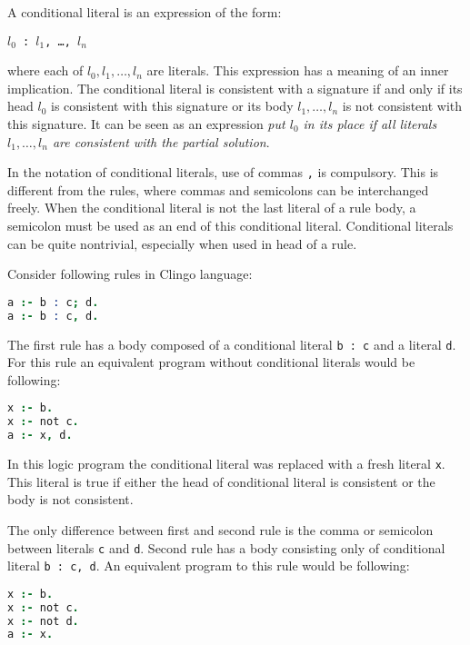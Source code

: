 A conditional literal is an expression of the form:
\begin{center}
    \texttt{$l_0$ : $l_1$, \ldots, $l_n$}  %
\end{center}
where each of $l_0, l_1, \ldots, l_n$ are literals. This expression has a meaning
of an inner implication. The conditional literal is consistent with a signature
if and only if its head $l_0$ is consistent with this signature
or its body $l_1, \ldots, l_n$ is not consistent with this signature.
It can be seen as an expression
\textit{put $l_0$ in its place if all literals $l_1, \ldots, l_n$
are consistent with the partial solution}.

In the notation of conditional literals, use of commas \texttt{,} is compulsory.
This is different from the rules, where commas and semicolons can be interchanged freely.
When the conditional literal is not the last literal of a rule body,
a semicolon must be used as an end of this conditional literal.
Conditional literals can be quite nontrivial, especially when used in head of a rule.

\begin{example}\label{exp:conditional_literal}
    Consider following rules in Clingo language:
    \begin{lstlisting}[language=prolog, numbers=none]
a :- b : c; d.
a :- b : c, d.
\end{lstlisting}

    The first rule has a body composed of a conditional literal
    \texttt{b : c} and a literal \texttt{d}.  %
    For this rule an equivalent program without conditional literals would be following:
    \begin{lstlisting}[language=prolog, numbers=none]
x :- b.
x :- not c.
a :- x, d.
\end{lstlisting}
    In this logic program the conditional literal was replaced with a fresh literal \texttt{x}.
    This literal is true if either the head of conditional literal is consistent
    or the body is not consistent.

    The only difference between first and second rule is the comma or semicolon
    between literals \texttt{c} and \texttt{d}.
    Second rule has a body consisting only of conditional literal \texttt{b : c, d}.  %
    An equivalent program to this rule would be following:
    \begin{lstlisting}[language=prolog, numbers=none]
x :- b.
x :- not c.
x :- not d.
a :- x.
\end{lstlisting}
\end{example}

